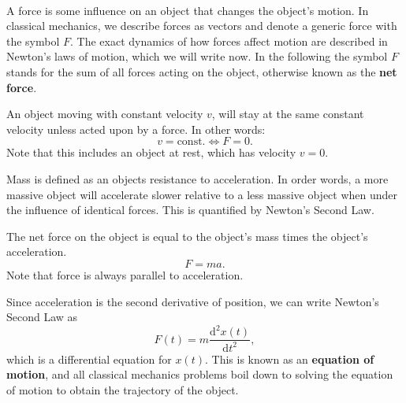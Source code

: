 \documentclass[../newtonian_mechanics.tex]{subfiles}
\begin{document}
        \paragraph{}
        A force is some influence on an object that changes the object's motion. In classical mechanics, we describe forces as vectors and denote a generic force with the symbol $F$. The exact dynamics of how forces affect motion are described in Newton's laws of motion, which we will write now. In the following the symbol $F$ stands for the sum of all forces acting on the object, otherwise known as the \textbf{net force}.
        \begin{definition}
            An object moving with constant velocity $v$, will stay at the same constant velocity unless acted upon by a force. In other words:
            \begin{equation}
                v=\text{const.}\iff F=0.
            \end{equation}
            Note that this includes an object at rest, which has velocity $v=0$.
        \end{definition}
        Mass is defined as an objects resistance to acceleration. In order words, a more massive object will accelerate slower relative to a less massive object when under the influence of identical forces. This is quantified by Newton's Second Law.
        \begin{definition}
            The net force on the object is equal to the object's mass times the object's acceleration.
            \begin{equation}
                F=ma.
            \end{equation}
            Note that force is always parallel to acceleration.
        \end{definition}
        Since acceleration is the second derivative of position, we can write Newton's Second Law as
        \begin{equation}
            F(t)=m\frac{\mathrm{d}^2x(t)}{\mathrm{d}t^2},
        \end{equation}
        which is a differential equation for $x(t)$. This is known as an \textbf{equation of motion}, and all classical mechanics problems boil down to solving the equation of motion to obtain the trajectory of the object.
\end{document}
